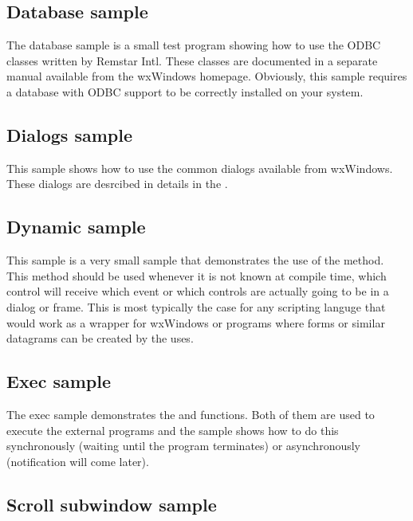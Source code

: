 \subsection{Database sample}\label{sampledb}

The database sample is a small test program showing how to use the ODBC
classes written by Remstar Intl. These classes are documented in a separate
manual available from the wxWindows homepage. Obviously, this sample
requires a database with ODBC support to be correctly installed on your
system.

\subsection{Dialogs sample}\label{sampledialogs}

This sample shows how to use the common dialogs available from wxWindows. These
dialogs are desrcibed in details in the .

\subsection{Dynamic sample}\label{sampledynamic}

This sample is a very small sample that demonstrates the use of the
 method. This method
should be used whenever it is not known at compile time, which control
will receive which event or which controls are actually going to be in
a dialog or frame. This is most typically the case for any scripting
languge that would work as a wrapper for wxWindows or programs where
forms or similar datagrams can be created by the uses.

\subsection{Exec sample}\label{sampleexec}

The exec sample demonstrates the  and 
 functions. Both of them are used to execute the
external programs and the sample shows how to do this synchronously (waiting
until the program terminates) or asynchronously (notification will come later).

\subsection{Scroll subwindow sample}\label{samplescrollsub}

